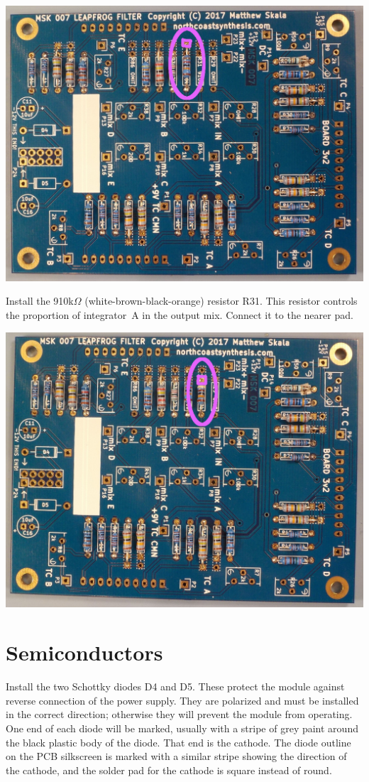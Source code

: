 \nopagebreak
\noindent\includegraphics[width=\linewidth]{res-820k3.jpg}

Install the 910k$\Omega$ (white-brown-black-orange) resistor R31.  This
resistor controls the proportion of integrator~A in the output mix.  Connect
it to the nearer pad.

\nopagebreak
\noindent\includegraphics[width=\linewidth]{res-910k3.jpg}

\section{Semiconductors}

Install the two Schottky diodes D4 and D5.  These protect the module against
reverse connection of the power supply.  They are polarized and must be
installed in the correct direction; otherwise they will prevent the module
from operating.  One end of each diode will be marked, usually with a stripe
of grey paint around the black plastic body of the diode.  That end is the
cathode.  The diode outline on the PCB silkscreen is marked with a
similar stripe showing the direction of the cathode, and the solder pad for
the cathode is square instead of round.

